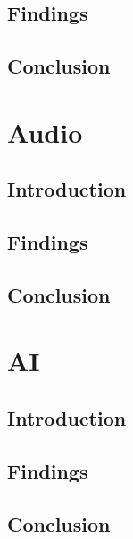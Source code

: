 \documentclass{projdoc}
\begin{document}
\subsection{Findings}

\subsection{Conclusion}

\section{Audio}

\subsection{Introduction}

\subsection{Findings}

\subsection{Conclusion}

\section{AI}

\subsection{Introduction}

\subsection{Findings}

\subsection{Conclusion}
\end{document}
